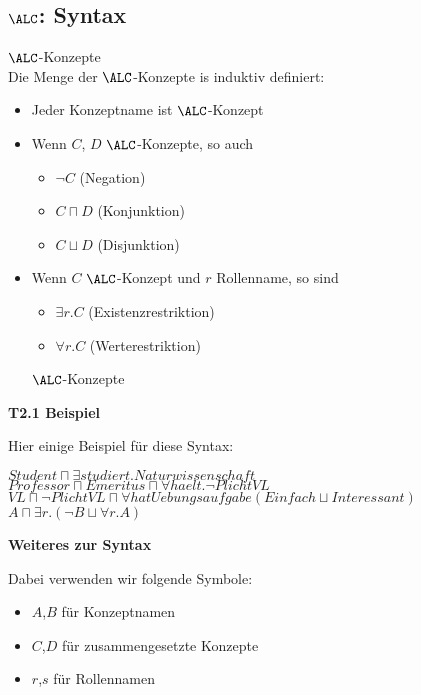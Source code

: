 \subsection{$\ALC$: Syntax}

\theoremstyle{definition}
\begin{definition}{$\ALC$-Konzepte} \\
	Die Menge der $\ALC$-Konzepte is induktiv definiert:
	\begin{itemize}
		\item Jeder Konzeptname ist $\ALC$-Konzept
		\item Wenn $C$, $D$ $\ALC$-Konzepte, so auch
		\begin{itemize}
			\item $\neg C$ \tabto{2cm}(Negation)
			\item $C \sqcap D$ \tabto{2cm}(Konjunktion)
			\item $C \sqcup D$ \tabto{2cm}(Disjunktion)
		\end{itemize}
		\item {Wenn $C$ $\ALC$-Konzept und $r$ Rollenname, so sind
		\begin{itemize}
			\item $\exists r.C$ \tabto{2cm}(Existenzrestriktion)
			\item $\forall r.C$ \tabto{2cm}(Werterestriktion)
		\end{itemize}
		$\ALC$-Konzepte}
	\end{itemize}
\end{definition}

\textbf{T2.1 Beispiel}

Hier einige Beispiel für diese Syntax:

\begin{center}
$Student \sqcap \exists studiert.Naturwissenschaft$ \\
$Professor \sqcap Emeritus \sqcap \forall haelt.\neg PlichtVL$ \\
$VL \sqcap \neg PlichtVL \sqcap \forall hatUebungsaufgabe(Einfach \sqcup Interessant)$ \\
$A \sqcap \exists r.(\neg B \sqcup \forall r.A)$
\end{center}

\textbf{Weiteres zur Syntax}

Dabei verwenden wir folgende Symbole:

\begin{itemize}
	\item{$A$,$B$ für Konzeptnamen}
	\item{$C$,$D$ für zusammengesetzte Konzepte}
	\item{$r$,$s$ für Rollennamen}
\end{itemize}

